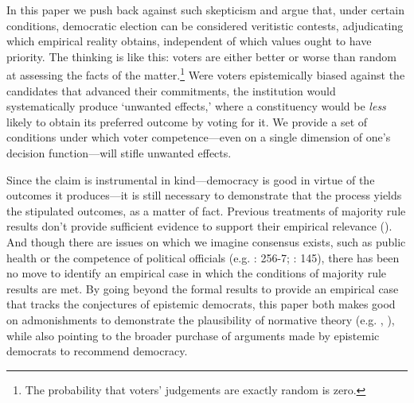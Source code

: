 \documentclass[11pt]{article}
\begin{document}
In this paper we push back against such skepticism and argue that, under certain conditions, 
 democratic election can be considered veritistic contests, adjudicating which empirical reality obtains, independent of which values ought to have priority. The thinking is like this: voters are either better or worse than random at assessing the facts of the matter.\footnote{The probability that voters' judgements are exactly random is zero.} Were voters epistemically biased against the candidates that advanced their commitments, the institution would systematically produce `unwanted effects,' where a constituency would be \emph{less} likely to obtain its preferred outcome by voting for it. We provide a set of conditions under which voter competence---even on a single dimension of one's decision function---will stifle unwanted effects.
 

Since the claim is instrumental in kind---democracy is good in virtue of the outcomes it produces---it is still necessary to demonstrate that the process yields the stipulated outcomes, as a matter of fact. Previous treatments of majority rule results don't provide sufficient evidence to support their empirical relevance  
(\cite{schwartzberg2015epistemic}). And though there are issues on which we imagine consensus exists, such as public health or the competence of political officials (e.g. \cite{Page2007}: 256-7; \cite{Landemore13}: 145), there has been no move to identify an empirical case in which the conditions of majority rule results are met. By going beyond the formal results to provide an empirical case that tracks the conjectures of epistemic democrats, this paper both makes good on admonishments to demonstrate the plausibility of normative theory (e.g. \cite{rehfeld2010offensive}, \cite{wiens2015against}), while also pointing to the broader purchase of arguments made by epistemic democrats to recommend democracy.
\end{document}
